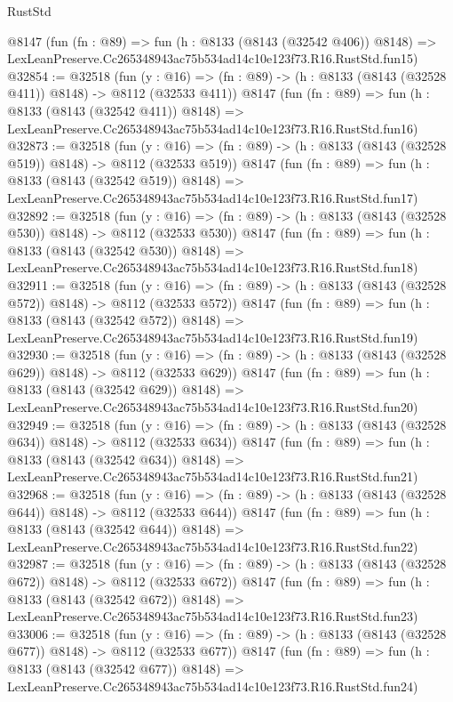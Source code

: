 \begin{lexlean}{RustStd}
\begin{coremodule}
    @8147
    (fun (fn : @89) =>
    fun (h : @8133 (@8143 (@32542 @406)) @8148) =>
    LexLeanPreserve.Cc265348943ac75b534ad14c10e123f73.R16.RustStd.fun15)
@32854 := @32518
    (fun (y : @16) => (fn : @89) -> (h : @8133 (@8143 (@32528 @411)) @8148) -> @8112 (@32533 @411))
    @8147
    (fun (fn : @89) =>
    fun (h : @8133 (@8143 (@32542 @411)) @8148) =>
    LexLeanPreserve.Cc265348943ac75b534ad14c10e123f73.R16.RustStd.fun16)
@32873 := @32518
    (fun (y : @16) => (fn : @89) -> (h : @8133 (@8143 (@32528 @519)) @8148) -> @8112 (@32533 @519))
    @8147
    (fun (fn : @89) =>
    fun (h : @8133 (@8143 (@32542 @519)) @8148) =>
    LexLeanPreserve.Cc265348943ac75b534ad14c10e123f73.R16.RustStd.fun17)
@32892 := @32518
    (fun (y : @16) => (fn : @89) -> (h : @8133 (@8143 (@32528 @530)) @8148) -> @8112 (@32533 @530))
    @8147
    (fun (fn : @89) =>
    fun (h : @8133 (@8143 (@32542 @530)) @8148) =>
    LexLeanPreserve.Cc265348943ac75b534ad14c10e123f73.R16.RustStd.fun18)
@32911 := @32518
    (fun (y : @16) => (fn : @89) -> (h : @8133 (@8143 (@32528 @572)) @8148) -> @8112 (@32533 @572))
    @8147
    (fun (fn : @89) =>
    fun (h : @8133 (@8143 (@32542 @572)) @8148) =>
    LexLeanPreserve.Cc265348943ac75b534ad14c10e123f73.R16.RustStd.fun19)
@32930 := @32518
    (fun (y : @16) => (fn : @89) -> (h : @8133 (@8143 (@32528 @629)) @8148) -> @8112 (@32533 @629))
    @8147
    (fun (fn : @89) =>
    fun (h : @8133 (@8143 (@32542 @629)) @8148) =>
    LexLeanPreserve.Cc265348943ac75b534ad14c10e123f73.R16.RustStd.fun20)
@32949 := @32518
    (fun (y : @16) => (fn : @89) -> (h : @8133 (@8143 (@32528 @634)) @8148) -> @8112 (@32533 @634))
    @8147
    (fun (fn : @89) =>
    fun (h : @8133 (@8143 (@32542 @634)) @8148) =>
    LexLeanPreserve.Cc265348943ac75b534ad14c10e123f73.R16.RustStd.fun21)
@32968 := @32518
    (fun (y : @16) => (fn : @89) -> (h : @8133 (@8143 (@32528 @644)) @8148) -> @8112 (@32533 @644))
    @8147
    (fun (fn : @89) =>
    fun (h : @8133 (@8143 (@32542 @644)) @8148) =>
    LexLeanPreserve.Cc265348943ac75b534ad14c10e123f73.R16.RustStd.fun22)
@32987 := @32518
    (fun (y : @16) => (fn : @89) -> (h : @8133 (@8143 (@32528 @672)) @8148) -> @8112 (@32533 @672))
    @8147
    (fun (fn : @89) =>
    fun (h : @8133 (@8143 (@32542 @672)) @8148) =>
    LexLeanPreserve.Cc265348943ac75b534ad14c10e123f73.R16.RustStd.fun23)
@33006 := @32518
    (fun (y : @16) => (fn : @89) -> (h : @8133 (@8143 (@32528 @677)) @8148) -> @8112 (@32533 @677))
    @8147
    (fun (fn : @89) =>
    fun (h : @8133 (@8143 (@32542 @677)) @8148) =>
    LexLeanPreserve.Cc265348943ac75b534ad14c10e123f73.R16.RustStd.fun24)

\end{coremodule}
\end{lexlean}
